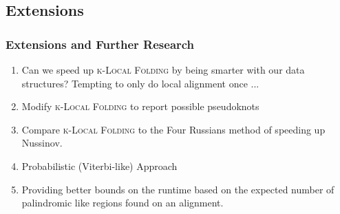 \documentclass{beamer}
\newcommand{\klf}{\textsc{k-Local Folding} }
\begin{document}
\begin{frame}
\section{Extensions}
\frametitle{Extensions and Further Research}
\begin{enumerate}
\item Can we speed up \klf by being smarter with our data structures? Tempting to only do local alignment once ... 
\item Modify \klf to report possible pseudoknots 
\item Compare \klf to the Four Russians method of speeding up Nussinov.
\item  Probabilistic (Viterbi-like) Approach
\item Providing better bounds on the runtime based on the expected number of palindromic like regions found on an alignment. 
\end{enumerate}
\end{frame}
\end{document}
